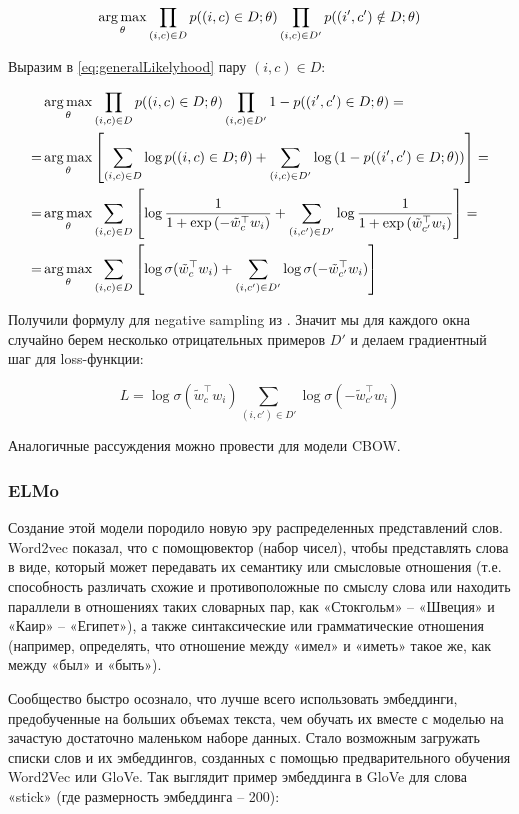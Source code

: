 \begin{equation} \label{eq:generalLikelyhood}
 \operatorname*{arg\,max}_{\theta} \prod_{(i,c)\in D} p((i,c)\in D;\theta) \prod_{(i,c)\in D'} p((i',c')\notin D;\theta)
\end{equation}

Выразим в \ref{eq:generalLikelyhood} пару $(i,c) \in D$:

\begin{equation}
\begin{aligned}
 & \operatorname*{arg\,max}_{\theta} \prod_{(i,c)\in D} p((i,c)\in D;\theta) \prod_{(i,c)\in D'} 1-p((i',c')\in D;\theta) = \\
 = & \operatorname*{arg\,max}_{\theta} \left[\sum_{(i,c)\in D} \log{p((i,c)\in D;\theta)} + \sum_{(i,c)\in D'} \log{(
1-p((i',c')\in D;\theta))} \right] = \\
 = & \operatorname*{arg\,max}_{\theta} \sum_{(i,c)\in D} \left[\log{\frac{1}{1+\exp{(-\tilde{w}_c^{\top} w_i)}}} +
\sum_{(i,c')\in D'} \log{\frac{1}{1+\exp{(\tilde{w}_{c'}^{\top} w_i)}}} \right] = \\
 = & \operatorname*{arg\,max}_{\theta} \sum_{(i,c)\in D} \left[\log\sigma(\tilde{w}_c^{\top} w_i) + \sum_{(i,c')\in D'}
\log\sigma(-\tilde{w}_{c'}^{\top} w_i)\right]
\end{aligned}
\end{equation}

Получили формулу для negative sampling из \cite{Mikolov:2}. Значит мы для каждого окна случайно берем
несколько отрицательных примеров $D'$ и делаем градиентный шаг для loss-функции:

\begin{equation}
 L = \log\sigma(\tilde{w}_c^{\top} w_i) \sum_{(i,c')\in D'} \log\sigma(-\tilde{w}_{c'}^{\top} w_i)
\end{equation}

Аналогичные рассуждения можно провести для модели CBOW.


\subsubsection{ELMo}

Создание этой модели породило новую эру распределенных представлений слов. Word2vec показал, что с помощювектор (набор чисел), чтобы представлять слова в виде, который может передавать их семантику или смысловые отношения (т.е. способность различать схожие и противоположные по смыслу слова или находить параллели в отношениях таких словарных пар, как «Стокгольм» – «Швеция» и «Каир» – «Египет»), а также синтаксические или грамматические отношения (например, определять, что отношение между «имел» и «иметь» такое же, как между «был» и «быть»).


Сообщество быстро осознало, что лучше всего использовать эмбеддинги, предобученные на больших объемах текста, чем обучать их вместе с моделью на зачастую достаточно маленьком наборе данных. Стало возможным загружать списки слов и их эмбеддингов, созданных с помощью предварительного обучения Word2Vec или GloVe. Так выглядит пример эмбеддинга в GloVe для слова «stick» (где размерность эмбеддинга – 200):







